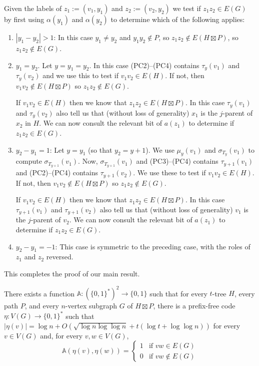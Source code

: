 \documentclass[kpfonts]{patmorin}
\begin{document}
Given the labels of $z_1:=(v_1,y_1)$ and $z_2:=(v_2,y_2)$ we test if $z_1z_2\in E(G)$ by first using $\alpha(y_1)$ and $\alpha(y_2)$ to determine which of the following applies:
\begin{enumerate}
  \item $|y_1-y_2|>1$: In this case $y_1\neq y_2$ and $y_1y_2\not\in P$, so $z_1z_2\not\in E(H\boxtimes P)$, so $z_1z_2\not\in E(G)$.

  \item $y_1=y_2$.  Let $y=y_1=y_2$.  In this case (PC2)--(PC4) contains $\tau_{y}(v_1)$ and $\tau_{y}(v_2)$ and we use this to test if $v_1v_2\in E(H)$.  If not, then $v_1v_2\not\in E(H\boxtimes P)$ so $z_1z_2\not\in E(G)$.  
  
  If $v_1v_2\in E(H)$ then we know that $z_1z_2\in E(H\boxtimes P)$.  In this case $\tau_{y}(v_1)$ and $\tau_{y}(v_2)$ also tell us that (without loss of generality) $x_1$ is the $j$-parent of $x_2$ in $H$.  We can now consult the relevant bit of $a(z_1)$ to determine if $z_1z_2\in E(G)$.

  \item $y_2-y_1=1$: Let $y=y_1$ (so that $y_2=y+1$).  We use $\mu_y(v_1)$ and $\sigma_{T_y}(v_1)$ to compute $\sigma_{T_{y+1}}(v_1)$.  Now, $\sigma_{T_{y+1}}(v_1)$ and (PC3)--(PC4) contains $\tau_{y+1}(v_1)$ and (PC2)--(PC4) contains $\tau_{y+1}(v_2)$.  We use these to test if $v_1v_2\in E(H)$.  If not, then $v_1v_2\not\in E(H\boxtimes P)$ so $z_1z_2\not\in E(G)$.  
  
  If $v_1v_2\in E(H)$ then we know that $z_1z_2\in E(H\boxtimes P)$.  In this case $\tau_{y+1}(v_1)$ and $\tau_{y+1}(v_2)$ also tell us that (without loss of generality) $v_1$ is the $j$-parent of $v_2$.  We can now consult the relevant bit of $a(z_1)$ to determine if $z_1z_2\in E(G)$.

  \item $y_2-y_1=-1$:  This case is symmetric to the preceding case, with the roles of $z_1$ and $z_2$ reversed.
\end{enumerate}

This completes the proof of our main result.

\begin{thm}
  There exists a function $\mathds{A}:(\{0,1\}^*)^2\to\{0,1\}$ such that for every $t$-tree $H$, every path $P$, and every $n$-vertex subgraph $G$ of $H\boxtimes P$, there is a prefix-free code $\eta:V(G)\to\{0,1\}^*$ such that
  $|\eta(v)|=\log n + O(\sqrt{\log n\log\log n}+t(\log t + \log\log n))$ for every $v\in V(G)$ and, for every $v,w\in V(G)$, 
  \[  \mathds{A}(\eta(v),\eta(w)) = \begin{cases}
        1 & \text{if $vw\in E(G)$} \\
        0 & \text{if $vw\not\in E(G)$}
      \end{cases}
      \]
\end{thm}
\end{document}
